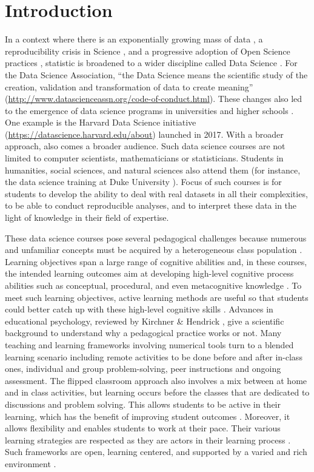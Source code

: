 \documentclass{aims}
\theoremstyle{definition}
\begin{document}
\hypertarget{introduction}{%
\section{Introduction}\label{introduction}}

In a context where there is an exponentially growing mass of data
\cite{Marx2013}, a reproducibility crisis in Science \cite{Baker2016},
and a progressive adoption of Open Science practices \cite{Banks2019},
statistic is broadened to a wider discipline called Data Science
\cite{Cleveland2001}. For the Data Science Association, ``the Data
Science means the scientific study of the creation, validation and
transformation of data to create meaning''
(\url{http://www.datascienceassn.org/code-of-conduct.html}). These
changes also led to the emergence of data science programs in
universities and higher schools \cite{Donoho2017, Cetinkaya-Rundel2021}.
One example is the Harvard Data Science initiative
(\url{https://datascience.harvard.edu/about}) launched in 2017. With a
broader approach, also comes a broader audience. Such data science
courses are not limited to computer scientists, mathematicians or
statisticians. Students in humanities, social sciences, and natural
sciences also attend them (for instance, the data science training at
Duke University \cite{Cetinkaya-Rundel2021}). Focus of such courses is
for students to develop the ability to deal with real datasets in all
their complexities, to be able to conduct reproducible analyses, and to
interpret these data in the light of knowledge in their field of
expertise.

These data science courses pose several pedagogical challenges because
numerous and unfamiliar concepts must be acquired by a heterogeneous
class population \cite{Guzman2019}. Learning objectives span a large
range of cognitive abilities and, in these courses, the intended
learning outcomes aim at developing high-level cognitive process
abilities such as conceptual, procedural, and even metacognitive
knowledge \cite{Krathwohl2002}. To meet such learning objectives, active
learning methods are useful so that students could better catch up with
these high-level cognitive skills \cite{Freeman2014}. Advances in
educational psychology, reviewed by Kirchner \& Hendrick
\cite{Kirschner2020}, give a scientific background to understand why a
pedagogical practice works or not. Many teaching and learning frameworks
involving numerical tools turn to a blended learning scenario including
remote activities to be done before and after in-class ones, individual
and group problem-solving, peer instructions and ongoing assessment. The
flipped classroom approach also involves a mix between at home and in
class activities, but learning occurs before the classes that are
dedicated to discussions and problem solving. This allows students to be
active in their learning, which has the benefit of improving student
outcomes \cite{Freeman2014}. Moreover, it allows flexibility and enables
students to work at their pace. Their various learning strategies are
respected as they are actors in their learning process
\cite{Spadafora2018}. Such frameworks are open, learning centered, and
supported by a varied and rich environment \cite{Burton2011}.
\end{document}
